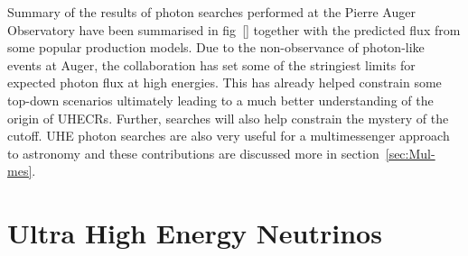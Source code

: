 Summary of the results of photon searches performed at the Pierre Auger Observatory have been summarised in fig~\ref{} together with the predicted flux from some popular production models. Due to the non-observance of photon-like events at Auger, the collaboration has set some of the stringiest limits for expected photon flux at high energies. This has already helped constrain some top-down scenarios ultimately leading to a much better understanding of the origin of UHECRs. Further, searches will also help constrain the mystery of the cutoff. UHE photon searches are also very useful for a multimessenger approach to astronomy and these contributions are discussed more in section~\ref{sec:Mul-mes}.


\section{Ultra High Energy Neutrinos}
\label{sec:UHENu}
